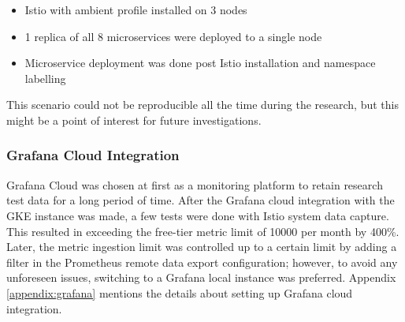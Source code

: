 \begin{itemize}
\item Istio with ambient profile installed on 3 nodes
\item 1 replica of all 8 microservices were deployed to a single node
\item Microservice deployment was done post Istio installation and namespace labelling
\end{itemize}

This scenario could not be reproducible all the time during the research, but this might be a point of interest for future investigations.

\subsubsection{Grafana Cloud Integration}
Grafana Cloud was chosen at first as a monitoring platform to retain research test data for a long period of time. After the Grafana cloud integration with the GKE instance was made, a few tests were done with Istio system data capture. This resulted in exceeding the free-tier metric limit of 10000 per month by 400\%. Later, the metric ingestion limit was controlled up to a certain limit by adding a filter in the Prometheus remote data export configuration; however, to avoid any unforeseen issues, switching to a Grafana local instance was preferred. Appendix \ref{appendix:grafana} mentions the details about setting up Grafana cloud integration.